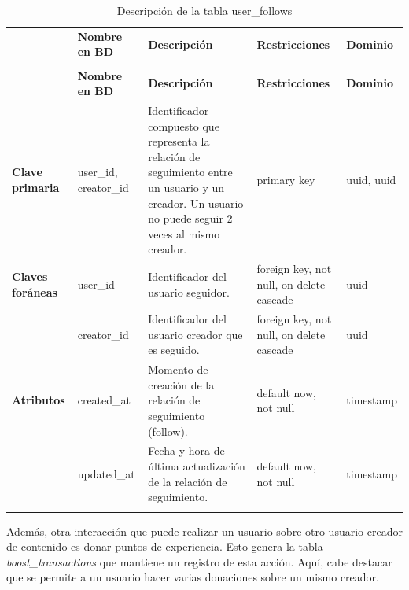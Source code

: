 \renewcommand{\arraystretch}{1.35}
\setlength{\tabcolsep}{3pt}
\small

\begin{longtable}{|
>{\raggedright\arraybackslash}p{1.9cm}|
>{\raggedright\arraybackslash}p{2.7cm}|
>{\raggedright\arraybackslash}p{4.9cm}|
>{\raggedright\arraybackslash}p{2.7cm}|
>{\raggedright\arraybackslash}p{2.1cm}|
}
\hline

\rowcolor[gray]{0.75}
\multicolumn{5}{|c|}{\textbf{Follows de usuarios}} \\
\hline

 & \textbf{Nombre en BD} & \textbf{Descripción} & \textbf{Restricciones} & \textbf{Dominio} \\
\hline
\endfirsthead

\hline
\rowcolor[gray]{0.75}
\multicolumn{5}{|c|}{\textbf{Follows de usuarios}} \\
\hline

 & \textbf{Nombre en BD} & \textbf{Descripción} & \textbf{Restricciones} & \textbf{Dominio} \\
\hline
\endhead

\textbf{Clave primaria}
& user\_\allowbreak id, creator\_\allowbreak id
& Identificador compuesto que representa la relación de seguimiento entre un usuario y un creador. Un usuario no puede seguir 2 veces al mismo creador.
& primary key
& uuid, uuid \\
\hline

\textbf{Claves foráneas}
& user\_\allowbreak id
& Identificador del usuario seguidor.
& foreign key, not null, on delete cascade
& uuid \\
\cline{2-5}

& creator\_\allowbreak id
& Identificador del usuario creador que es seguido.
& foreign key, not null, on delete cascade
& uuid \\
\hline

\textbf{Atributos}
& created\_\allowbreak at
& Momento de creación de la relación de seguimiento (follow).
& default now, not null
& timestamp \\
\cline{2-5}

& updated\_\allowbreak at
& Fecha y hora de última actualización de la relación de seguimiento.
& default now, not null
& timestamp \\
\hline

\caption{Descripción de la tabla user\_follows}
\end{longtable}

Además, otra interacción que puede realizar un usuario sobre otro usuario creador de contenido es donar puntos de experiencia. Esto genera la tabla \textit{boost\_transactions} que mantiene un registro de esta acción. Aquí, cabe destacar que se permite a un usuario hacer varias donaciones sobre un mismo creador.

